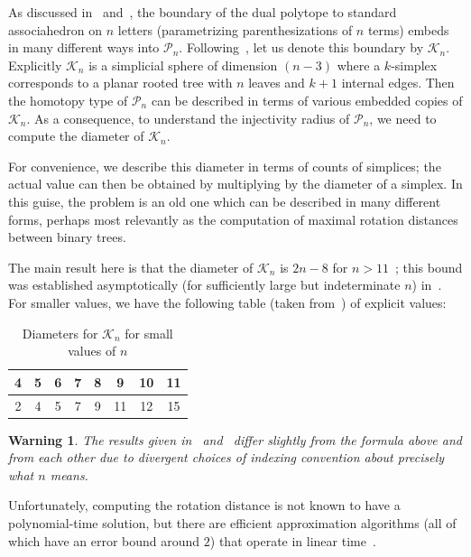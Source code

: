 \documentclass[a4paper,11pt]{article}
\newtheorem{warning}[theorem]{Warning}
\newcommand{\aK}{\mathcal{K}}
\newcommand{\aP}{\mathcal{P}}
\begin{document}
As discussed in~\cite[Prop. 1]{devadoss2014polyhedral} and~\cite[\S 3.1]{billera2001geometry}, the boundary of the dual polytope to standard associahedron on $n$ letters (parametrizing parenthesizations of $n$ terms) embeds in many different ways into $\aP_n$.
Following~\cite{devadoss2014polyhedral}, let us denote this boundary by $\aK_n$.
Explicitly $\aK_n$ is a simplicial sphere of dimension $(n-3)$ where a $k$-simplex corresponds to a planar rooted tree with $n$ leaves and $k+1$ internal edges.
Then the homotopy type of $\aP_n$ can be described in terms of various embedded copies of $\aK_n$.
As a consequence, to understand the injectivity radius of $\aP_n$, we need to compute the diameter of $\aK_n$.

For convenience, we describe this diameter in terms of counts of simplices; the actual value can then be obtained by multiplying by the diameter of a simplex.
In this guise, the problem is an old one which can be described in many different forms, perhaps most relevantly as the computation of maximal rotation distances between binary trees.

The main result here is that the diameter of $\aK_n$ is $2n - 8$ for $n > 11$~\cite{pournin2014diameter}; this bound was established asymptotically (for sufficiently large but indeterminate $n$) in~\cite{sleator1988rotation}.
For smaller values, we have the following table (taken from~\cite[\S2.3]{sleator1988rotation}) of explicit values:

\begin{table}[ht]
    \caption{Diameters for $\aK_n$ for small values of $n$}
    \centering
    \begin{tabular}{c c c c c c c c}
    \hline\hline
    4 & 5 & 6 & 7 & 8 & 9 & 10 & 11 \\
    \hline
    2 & 4 & 5 & 7 & 9 & 11 & 12 & 15 \\
    \hline
    \end{tabular}
\end{table}

\begin{warning}
The results given in~\cite{pournin2014diameter} and~\cite{sleator1988rotation} differ slightly from the formula above and from each other due to divergent choices of indexing convention about precisely what $n$ means.
\end{warning}

Unfortunately, computing the rotation distance is not known to have a polynomial-time solution, but there are efficient approximation algorithms (all of which have an error bound around $2$) that operate in linear time~\cite{cleary2010linear}.
\end{document}
